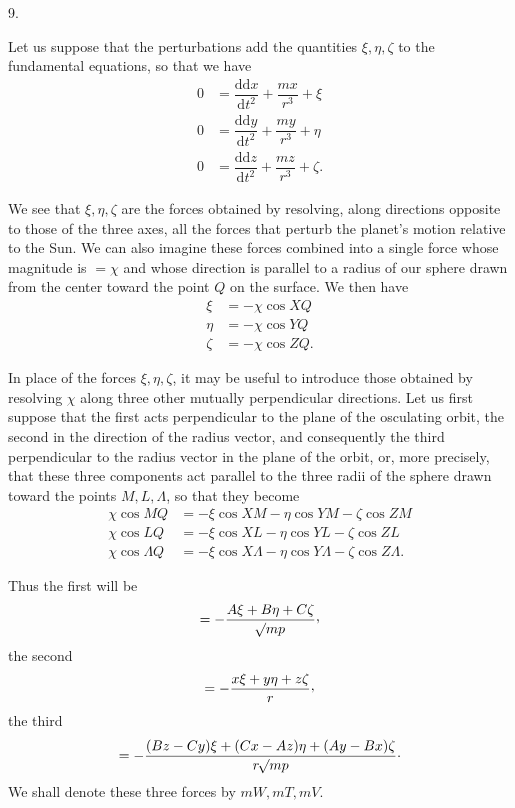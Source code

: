 \par{}\bigskip
{}
\begin{center}9.\end{center}
\noindent\hspace*{\parindent}Let us suppose that the perturbations add the quantities \(\xi,\eta,\zeta\) to the fundamental equations, so that we have
\[
\begin{aligned}
0&=\dfrac{\mathrm{dd}x}{\mathrm{d}t^2}+\dfrac{mx}{r^3}+\xi\\[5pt]
0&=\dfrac{\mathrm{dd}y}{\mathrm{d}t^2}+\dfrac{my}{r^3}+\eta\\[5pt]
0&=\dfrac{\mathrm{dd}z}{\mathrm{d}t^2}+\dfrac{mz}{r^3}+\zeta.
\end{aligned}
\]
\par We see that \(\xi,\eta,\zeta\) are the forces obtained by resolving, along directions opposite to those of the three axes, all the forces that perturb the planet's motion relative to the Sun. We can also imagine these forces combined into a single force whose magnitude is \(=\chi\) and whose direction is parallel to a radius of our sphere drawn from the center toward the point \(Q\) on the surface. We then have
\[
\begin{aligned}
\xi&=-\chi\cos XQ\\
\eta&=-\chi\cos YQ\\
\zeta&=-\chi\cos ZQ.
\end{aligned}
\]
\par In place of the forces \(\xi,\eta,\zeta\), it may be useful to introduce those obtained by resolving \(\chi\) along three other mutually perpendicular directions. Let us first suppose that the first acts perpendicular to the plane of the osculating orbit, the second in the direction of the radius vector, and consequently the third perpendicular to the radius vector in the plane of the orbit, or, more precisely, that these three components act parallel to the three radii of the sphere drawn toward the points \(M,L,\Lambda\), so that they become
\[
\begin{aligned}
\chi\cos MQ&=-\xi\cos XM-\eta\cos YM-\zeta\cos ZM\\
\chi\cos LQ&=-\xi\cos XL-\eta\cos YL-\zeta\cos ZL\\
\chi\cos\Lambda Q&=-\xi\cos X\Lambda-\eta\cos Y\Lambda-\zeta\cos Z\Lambda.
\end{aligned}
\]
\par Thus the first will be
\[
=-\dfrac{A\xi+B\eta+C\zeta}{\BareRoot{mp}}\mathpunct{\raisebox{.45ex}{,}}
\]
the second
\[
=-\dfrac{x\xi+y\eta+z\zeta}{r}\mathpunct{\raisebox{.45ex}{,}}
\]
the third
\[
=-\dfrac{(Bz-Cy)\xi+(Cx-Az)\eta+(Ay-Bx)\zeta}{r\mathord{{}^{}\!\surd}mp}\mathpunct{\cdot}
\]
We shall denote these three forces by \(mW,mT,mV\).
